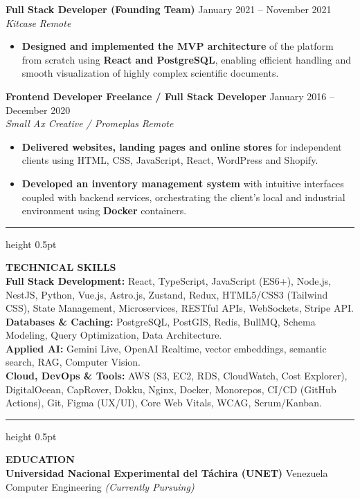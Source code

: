 \documentclass[11pt]{article}
\begin{document}
\vspace{4pt}

\textbf{Full Stack Developer (Founding Team)} \hfill January 2021 – November 2021 \\
\textit{Kitcase} \hfill \textit{Remote}
\begin{itemize}[noitemsep, topsep=1pt, leftmargin=15pt]
    \item \textbf{Designed and implemented the MVP architecture} of the platform from scratch using \textbf{React and PostgreSQL}, enabling efficient handling and smooth visualization of highly complex scientific documents.
\end{itemize}

\vspace{4pt}

\textbf{Frontend Developer Freelance / Full Stack Developer} \hfill January 2016 – December 2020 \\
\textit{Small Ax Creative / Promeplas} \hfill \textit{Remote}
\begin{itemize}[noitemsep, topsep=1pt, leftmargin=15pt]
    \item \textbf{Delivered websites, landing pages and online stores} for independent clients using HTML, CSS, JavaScript, React, WordPress and Shopify.
    \item \textbf{Developed an inventory management system} with intuitive interfaces coupled with backend services, orchestrating the client's local and industrial environment using \textbf{Docker} containers.
\end{itemize}

\vspace{5pt}
\hrule height 0.5pt
\vspace{4pt}

\textbf{TECHNICAL SKILLS} \\
\textbf{Full Stack Development:} React, TypeScript, JavaScript (ES6+), Node.js, NestJS, Python, Vue.js, Astro.js, Zustand, Redux, HTML5/CSS3 (Tailwind CSS), State Management, Microservices, RESTful APIs, WebSockets, Stripe API. \\
\textbf{Databases \& Caching:} PostgreSQL, PostGIS, Redis, BullMQ, Schema Modeling, Query Optimization, Data Architecture. \\
\textbf{Applied AI:} Gemini Live, OpenAI Realtime, vector embeddings, semantic search, RAG, Computer Vision. \\
\textbf{Cloud, DevOps \& Tools:} AWS (S3, EC2, RDS, CloudWatch, Cost Explorer), DigitalOcean, CapRover, Dokku, Nginx, Docker, Monorepos, CI/CD (GitHub Actions), Git, Figma (UX/UI), Core Web Vitals, WCAG, Scrum/Kanban.

\vspace{5pt}
\hrule height 0.5pt
\vspace{4pt}

\textbf{EDUCATION} \\
\textbf{Universidad Nacional Experimental del Táchira (UNET)} \hfill Venezuela \\
Computer Engineering \hfill \textit{(Currently Pursuing)}

\vfill
\end{document}
